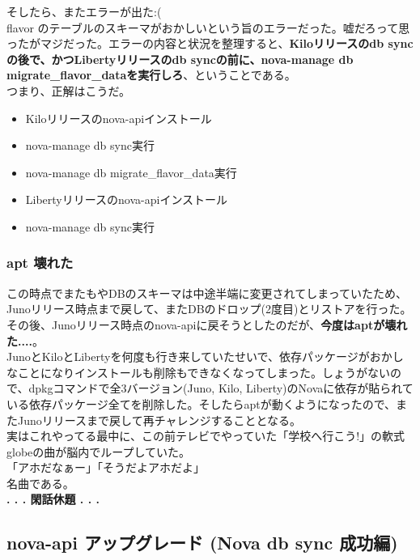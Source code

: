 \documentclass[9pt,b5paper,tombo,openany]{jsbook}
\begin{document}
\noindent
そしたら、またエラーが出た:(\\[1ex]

flavor のテーブルのスキーマがおかしいという旨のエラーだった。嘘だろって思ったがマジだった。エラーの内容と状況を整理すると、\textbf{Kiloリリースのdb syncの後で、かつLibertyリリースのdb syncの前に、nova-manage db migrate\_flavor\_dataを実行しろ}、ということである。\\[1ex]

\noindent
つまり、正解はこうだ。

\begin{itemize}
  \item Kiloリリースのnova-apiインストール
  \item nova-manage db sync実行
  \item nova-manage db migrate\_flavor\_data実行
  \item Libertyリリースのnova-apiインストール
  \item nova-manage db sync実行
\end{itemize}


\subsubsection{apt 壊れた}
この時点でまたもやDBのスキーマは中途半端に変更されてしまっていたため、Junoリリース時点まで戻して、またDBのドロップ(2度目)とリストアを行った。その後、Junoリリース時点のnova-apiに戻そうとしたのだが、\textbf{今度はaptが壊れた....}。\\[1ex]

JunoとKiloとLibertyを何度も行き来していたせいで、依存パッケージがおかしなことになりインストールも削除もできなくなってしまった。しょうがないので、dpkgコマンドで全3バージョン(Juno, Kilo, Liberty)のNovaに依存が貼られている依存パッケージ全てを削除した。そしたらaptが動くようになったので、またJunoリリースまで戻して再チャレンジすることとなる。\\[1ex]

実はこれやってる最中に、この前テレビでやっていた「学校へ行こう!」の軟式globeの曲が脳内でループしていた。\\[1ex]

\noindent
「アホだなぁー」「そうだよアホだよ」\\[1ex]

\noindent
名曲である。\\[1ex]

\noindent
\textbf{. . . 閑話休題 . . .}


\subsection{nova-api アップグレード (Nova db sync 成功編)}
\end{document}

